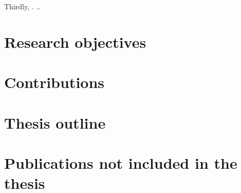   Thirdly, .
  ..

\section{Research objectives}

\section{Contributions}

\section{Thesis outline}

\section{Publications not included in the thesis}





